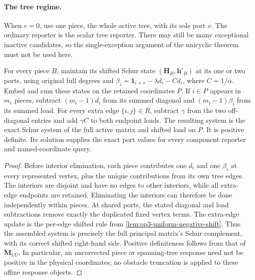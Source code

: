 \paragraph{The tree regime.}
When $r=0$, use one piece, the whole active tree, with its sole port $v$.
The ordinary reporter is the scalar tree reporter. There may still be many
exceptional inactive candidates, so the single-exception argument of the
unicyclic theorem must not be used here.

\begin{lemma}
\label{lem:op3-coarse-cycle-assembly}
For every piece $B$, maintain its shifted Schur state
$(\boldsymbol H_B,\boldsymbol h'_B)$ at its one or two ports, using
original full degrees and
$\beta_i=\mathbf1_{i=v}-\lambda d_i-Cd_i$, where $C=1/\bar\alpha$.
Embed and sum these states on the retained coordinates $P$. If $i\in P$
appears in $m_i$ pieces, subtract $(m_i-1)d_i$ from its summed diagonal
and $(m_i-1)\beta_i$ from its summed load. For every extra edge
$\{i,j\}\in R$, subtract $\gamma$ from the two off-diagonal entries and
add $\gamma C$ to both endpoint loads. The resulting system is the exact
Schur system of the full active matrix and shifted load on $P$.
It is positive definite. Its solution supplies the exact port values for
every component reporter and named-coordinate query.
\end{lemma}
\begin{proof}
Before interior elimination, each piece contributes one $d_i$ and one
$\beta_i$ at every represented vertex, plus the unique contributions from
its own tree edges. The interiors are disjoint and have no edges to other
interiors, while all extra-edge endpoints are retained. Eliminating the
interiors can therefore be done independently within pieces. At shared
ports, the stated diagonal and load subtractions remove exactly the
duplicated fixed vertex terms. The extra-edge update is the per-edge
shifted rule from \cref{lem:op3-uniform-negative-shift}. Thus the assembled
system is precisely the full principal matrix's Schur complement, with its
correct shifted right-hand side. Positive definiteness follows from that
of $\boldsymbol M_{UU}$. In particular, an uncorrected piece or spanning-tree
response need not be positive in the physical coordinates; no obstacle
truncation is applied to these affine response objects.
\end{proof}

